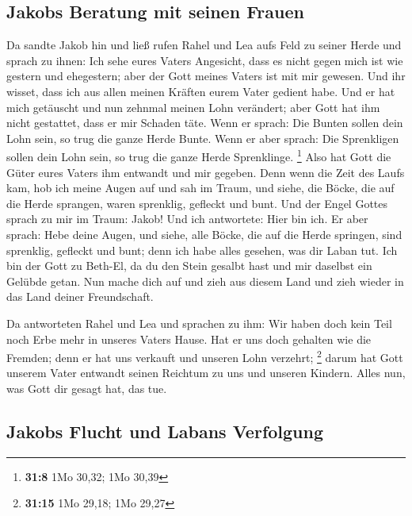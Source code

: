 \hypertarget{jakobs-beratung-mit-seinen-frauen}{%
\subsection{Jakobs Beratung mit seinen
Frauen}\label{jakobs-beratung-mit-seinen-frauen}}

 Da sandte Jakob hin und ließ rufen Rahel und Lea aufs
Feld zu seiner Herde  und sprach zu ihnen: Ich sehe eures
Vaters Angesicht, dass es nicht gegen mich ist wie gestern und
ehegestern; aber der Gott meines Vaters ist mit mir gewesen.
 Und ihr wisset, dass ich aus allen meinen Kräften eurem
Vater gedient habe.  Und er hat mich getäuscht und nun
zehnmal meinen Lohn verändert; aber Gott hat ihm nicht gestattet, dass
er mir Schaden täte.  Wenn er sprach: Die Bunten sollen
dein Lohn sein, so trug die ganze Herde Bunte. Wenn er aber sprach: Die
Sprenkligen sollen dein Lohn sein, so trug die ganze Herde Sprenklinge.
\footnote{\textbf{31:8} 1Mo 30,32; 1Mo 30,39}  Also hat
Gott die Güter eures Vaters ihm entwandt und mir gegeben.
 Denn wenn die Zeit des Laufs kam, hob ich meine Augen
auf und sah im Traum, und siehe, die Böcke, die auf die Herde sprangen,
waren sprenklig, gefleckt und bunt.  Und der Engel Gottes
sprach zu mir im Traum: Jakob! Und ich antwortete: Hier bin ich.
 Er aber sprach: Hebe deine Augen, und siehe, alle Böcke,
die auf die Herde springen, sind sprenklig, gefleckt und bunt; denn ich
habe alles gesehen, was dir Laban tut.  Ich bin der Gott
zu Beth-El, da du den Stein gesalbt hast und mir daselbst ein Gelübde
getan. Nun mache dich auf und zieh aus diesem Land und zieh wieder in
das Land deiner Freundschaft.

 Da antworteten Rahel und Lea und sprachen zu ihm: Wir
haben doch kein Teil noch Erbe mehr in unseres Vaters Hause.
 Hat er uns doch gehalten wie die Fremden; denn er hat
uns verkauft und unseren Lohn verzehrt; \footnote{\textbf{31:15} 1Mo
  29,18; 1Mo 29,27}  darum hat Gott unserem Vater
entwandt seinen Reichtum zu uns und unseren Kindern. Alles nun, was Gott
dir gesagt hat, das tue.

\hypertarget{jakobs-flucht-und-labans-verfolgung}{%
\subsection{Jakobs Flucht und Labans
Verfolgung}\label{jakobs-flucht-und-labans-verfolgung}}

